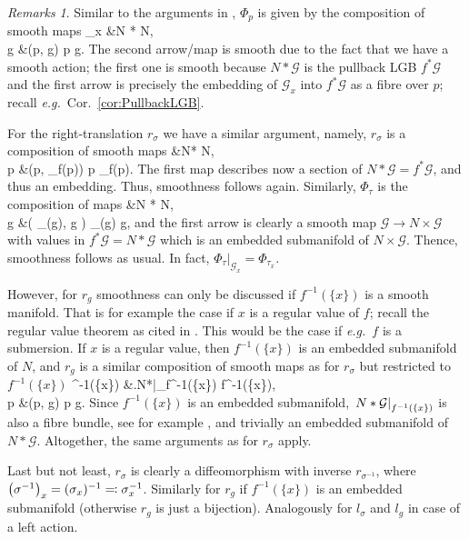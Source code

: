 \documentclass[a4paper,oneside,11pt,bibliography=totoc]{scrartcl}
\def\bas#1\eas{\begin{align*}#1\end{align*}}
\theoremstyle{plain}
\theoremstyle{remark}
\newtheorem{remark}[theorem]{Remarks}
\theoremstyle{definition}
\begin{document}
\begin{remark}\label{SmoothnessOfACtionTranslations}
\leavevmode\newline
Similar to the arguments in \cite[\S 3.2, discussion after Def.\ 3.2.3, page 131]{Hamilton}, $\Phi_p$ is given by the composition of smooth maps
\bas
\mathcal{G}_x &\to N *  \to N,\\
g &\mapsto (p, g) \mapsto p \cdot g.
\eas
The second arrow/map is smooth due to the fact that we have a smooth action; the first one is smooth because $N * \mathcal{G}$ is the pullback LGB $f^*\mathcal{G}$ and the first arrow is precisely the embedding of $\mathcal{G}_x$ into $f^*\mathcal{G}$ as a fibre over $p$; recall \textit{e.g.}\ Cor.\ \ref{cor:PullbackLGB}.

For the right-translation $r_\sigma$ we have a similar argument, namely, $r_\sigma$ is a composition of smooth maps
\bas
N &\to N* \to N,\\
p &\mapsto \mleft(p, \sigma_{f(p)}\mright) \mapsto p \cdot \sigma_{f(p)}.
\eas
The first map describes now a section of $N*\mathcal{G} = f^*\mathcal{G}$, and thus an embedding. Thus, smoothness follows again. Similarly, $\Phi_\tau$ is the composition of maps
\bas
\mathcal{G} &\to N *  \to N,\\
g &\mapsto \mleft( \tau_{\pi(g)}, g \mright) \mapsto \tau_{\pi(g)} \cdot g,
\eas
and the first arrow is clearly a smooth map $\mathcal{G} \to N \times \mathcal{G}$ with values in $f^*\mathcal{G} = N * \mathcal{G}$ which is an embedded submanifold of $N \times \mathcal{G}$. Thence, smoothness follows as usual. In fact, $\Phi_\tau|_{\mathcal{G}_x} = \Phi_{\tau_x}$.

However, for $r_g$ smoothness can only be discussed if $f^{-1}(\{x\})$ is a smooth manifold. That is for example the case if $x$ is a regular value of $f$; recall the regular value theorem as cited in \cite[\S A.1, Thm.\ A.1.32, page 611]{Hamilton}. This would be the case if \textit{e.g.}\ $f$ is a submersion. If $x$ is a regular value, then $f^{-1}(\{x\})$ is an embedded submanifold of $N$, and $r_g$ is a similar composition of smooth maps as for $r_\sigma$ but restricted to $f^{-1}(\{x\})$
\bas
f^{-1}(\{x\}) &\to \mleft.N*\mright|_{f^{-1}(\{x\})} \to f^{-1}(\{x\}),\\
p &\mapsto (p, g) \mapsto p \cdot g.
\eas
Since $f^{-1}(\{x\})$ is an embedded submanifold, $\mleft.N*\mathcal{G}\mright|_{f^{-1}(\{x\})}$ is also a fibre bundle, see for example \cite[\S 4.1, Lemma 4.1.16, page 204]{Hamilton}, and trivially an embedded submanifold of $N*\mathcal{G}$. Altogether, the same arguments as for $r_\sigma$ apply.

Last but not least, $r_\sigma$ is clearly a diffeomorphism with inverse $r_{\sigma^{-1}}$, where $\mleft(\sigma^{-1}\mright)_x = (\sigma_x)^{-1} \eqqcolon \sigma_x^{-1}$. Similarly for $r_g$ if $f^{-1}(\{x\})$ is an embedded submanifold (otherwise $r_g$ is just a bijection). Analogously for $l_\sigma$ and $l_g$ in case of a left action.
\end{remark}
\end{document}
